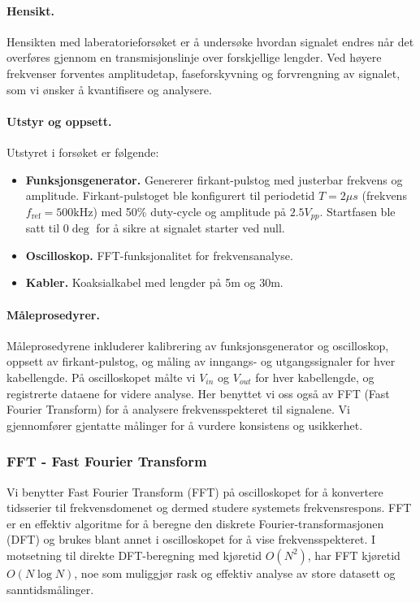\paragraph{Hensikt.} Hensikten med laberatorieforsøket er å undersøke hvordan signalet endres når det overføres gjennom en transmisjonslinje over forskjellige lengder. Ved høyere frekvenser forventes amplitudetap, faseforskyvning og forvrengning av signalet, som vi ønsker å kvantifisere og analysere.

\paragraph{Utstyr og oppsett.}
Utstyret i forsøket er følgende:
\begin{itemize}
    \item \textbf{Funksjonsgenerator.} Genererer firkant-pulstog med justerbar frekvens og amplitude. Firkant-pulstoget ble konfigurert til periodetid $T = 2 \mu s$ (frekvens $f_\mathrm{ref} = 500 \mathrm{kHz}$) med 50\% duty-cycle og amplitude på $2.5V_{pp}$. Startfasen ble satt til $0\deg$ for å sikre at signalet starter ved null.
    \item \textbf{Oscilloskop.} FFT-funksjonalitet for frekvensanalyse.
    \item \textbf{Kabler.} Koaksialkabel med lengder på 5m og 30m.
\end{itemize}

\paragraph{Måleprosedyrer.}
Måleprosedyrene inkluderer kalibrering av funksjonsgenerator og oscilloskop, oppsett av firkant-pulstog, og måling av inngangs- og utgangssignaler for hver kabellengde. På oscilloskopet målte vi $V_{in}$ og $V_{out}$ for hver kabellengde, og registrerte dataene for videre analyse. Her benyttet vi oss også av FFT (Fast Fourier Transform) for å analysere frekvensspekteret til signalene. Vi gjennomfører gjentatte målinger for å vurdere konsistens og usikkerhet.

\subsubsection{FFT - Fast Fourier Transform}
Vi benytter Fast Fourier Transform (FFT) på oscilloskopet for å konvertere tidsserier til frekvensdomenet og dermed studere systemets frekvensrespons. FFT er en effektiv algoritme for å beregne den diskrete Fourier-transformasjonen (DFT) og brukes blant annet i oscilloskopet for å vise frekvensspekteret. I motsetning til direkte DFT-beregning med kjøretid $O(N^2)$, har FFT kjøretid $O(N\log N)$, noe som muliggjør rask og effektiv analyse av store datasett og sanntidsmålinger.
